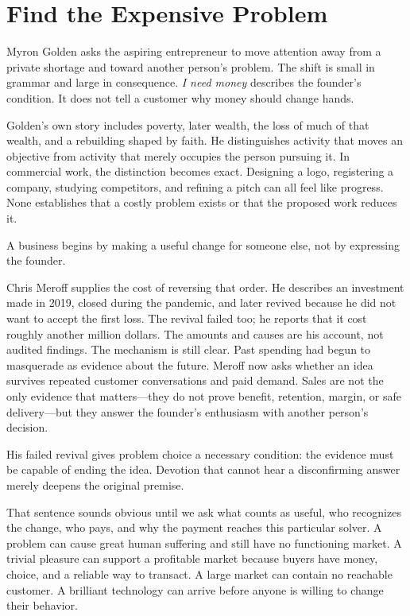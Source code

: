 \chapter{Find the Expensive Problem}

Myron Golden asks the aspiring entrepreneur to move attention away from a
private shortage and toward another person's problem. The shift is small in
grammar and large in consequence. \emph{I need money} describes the founder's
condition. It does not tell a customer why money should change hands.

Golden's own story includes poverty, later wealth, the loss of much of that
wealth, and a rebuilding shaped by faith. He distinguishes activity that moves
an objective from activity that merely occupies the person pursuing it. In
commercial work, the distinction becomes exact. Designing a logo, registering
a company, studying competitors, and refining a pitch can all feel like
progress. None establishes that a costly problem exists or that the proposed
work reduces it.

A business begins by making a useful change for someone else, not by expressing
the founder.

Chris Meroff supplies the cost of reversing that order. He describes an
investment made in 2019, closed during the pandemic, and later revived because
he did not want to accept the first loss. The revival failed too; he reports
that it cost roughly another million dollars. The amounts and causes are his
account, not audited findings. The mechanism is still clear. Past spending had
begun to masquerade as evidence about the future. Meroff now asks whether an
idea survives repeated customer conversations and paid demand. Sales are not
the only evidence that matters---they do not prove benefit, retention, margin,
or safe delivery---but they answer the founder's enthusiasm with another
person's decision.

His failed revival gives problem choice a necessary condition: the evidence
must be capable of ending the idea. Devotion that cannot hear a disconfirming
answer merely deepens the original premise.

That sentence sounds obvious until we ask what counts as useful, who recognizes
the change, who pays, and why the payment reaches this particular solver. A
problem can cause great human suffering and still have no functioning market.
A trivial pleasure can support a profitable market because buyers have money,
choice, and a reliable way to transact. A large market can contain no reachable
customer. A brilliant technology can arrive before anyone is willing to change
their behavior.

